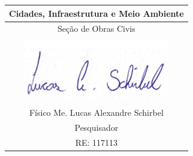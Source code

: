 \begin{table}[h]
  \centering
  \begin{tabular}{c}
    \hline
    Cidades, Infraestrutura e Meio Ambiente \\
    \hline
    Seção de Obras Civis \\
    \hline \\[0.5ex]
    \includegraphics{./figuras/assinatura.png} %
    \hline \\[0.5ex]
    Físico Me. Lucas Alexandre Schirbel \\
    Pesquisador \\
    RE: 117113 \\
    \hline
  \end{tabular}
\end{table}
